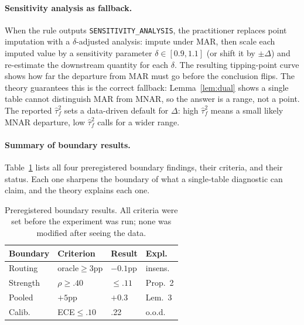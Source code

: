 \documentclass[conference]{IEEEtran}
\begin{document}
\paragraph{Sensitivity analysis as fallback.} When the rule outputs
\texttt{SENSITIVITY\_ANALYSIS}, the practitioner replaces point imputation with a
$\delta$-adjusted analysis: impute under MAR, then scale each imputed value by a sensitivity
parameter $\delta\in[0.9,1.1]$ (or shift it by $\pm\Delta$) and re-estimate the downstream
quantity for each $\delta$. The resulting tipping-point curve shows how far the departure
from MAR must go before the conclusion flips. The theory guarantees this is the correct
fallback: Lemma~\ref{lem:dual} shows a single table cannot distinguish MAR from MNAR, so the
answer is a range, not a point. The reported $\hat\tau_f^2$ sets a data-driven default for
$\Delta$: high $\hat\tau_f^2$ means a small likely MNAR departure, low $\hat\tau_f^2$ calls
for a wider range.

\paragraph{Summary of boundary results.} Table~\ref{tab:negatives} lists all four
preregistered boundary findings, their criteria, and their status. Each one sharpens the
boundary of what a single-table diagnostic can claim, and the theory explains each one.

\begin{table}[t]
\caption{Preregistered boundary results. All criteria were set before the experiment was
run; none was modified after seeing the data.}
\label{tab:negatives}
\centering\small
\begin{tabular}{@{}llll@{}}
\toprule
Boundary & Criterion & Result & Expl. \\
\midrule
Routing & oracle$\ge$3pp & $-0.1$pp & insens. \\
Strength & $\rho\ge.40$ & $\le.11$ & Prop.~2 \\
Pooled & $+5$pp & $+0.3$ & Lem.~3 \\
Calib. & ECE$\le.10$ & .22 & o.o.d. \\
\bottomrule
\end{tabular}
\end{table}
\end{document}
